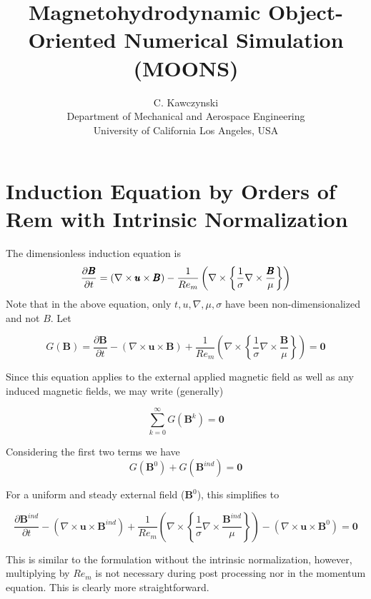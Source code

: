 \documentclass[11pt]{article}
\begin{document}
\doublespacing
\title{Magnetohydrodynamic Object-Oriented Numerical Simulation (MOONS)}
\author{C. Kawczynski \\
Department of Mechanical and Aerospace Engineering \\
University of California Los Angeles, USA\\
}
\maketitle

\section{Induction Equation by Orders of Rem with Intrinsic Normalization}
The dimensionless induction equation is
\begin{equation}
  \label{eq:ind}
  \frac{\partial \pmb{B}}{\partial t} 
  =
  (\nabla \times \pmb{u} \times \pmb{B})
  - \\
  \frac{1}{Re_m}
  \left(
  \nabla \times
  \left\{
  \frac{1}{\sigma}
  \nabla \times
  \frac{\pmb{B}}{\mu}
  \right\}
  \right)
\end{equation}
Note that in the above equation, only $t,u,\nabla , \mu, \sigma$ have been non-dimensionalized and not $B$. Let

\begin{equation}
  G(\pmb{B})
  =
  \frac{\partial \pmb{B}}{\partial t} 
  -
  (\nabla \times \pmb{u} \times \pmb{B})
  +
  \frac{1}{Re_m}
  \left(
  \nabla \times
  \left\{
  \frac{1}{\sigma}
  \nabla \times
  \frac{\pmb{B}}{\mu}
  \right\}
  \right)
  =
  \pmb{0}
\end{equation}

Since this equation applies to the external applied magnetic field as well as any induced magnetic fields, we may write (generally)

\begin{equation}
	\sum_{k=0}^{\infty} G(\pmb{B}^k)
	=
	\pmb{0}
\end{equation}

Considering the first two terms we have
\begin{equation}
  G(\pmb{B}^0)
  +
  G(\pmb{B}^{ind})
  =
  \pmb{0}
\end{equation}

For a uniform and steady external field ($\pmb{B}^0$), this simplifies to


\begin{equation}
  \frac{\partial \pmb{B}^{ind}}{\partial t} 
  -
  (\nabla \times \pmb{u} \times \pmb{B}^{ind})
  +
  \frac{1}{Re_m}
  \left(
  \nabla \times
  \left\{
  \frac{1}{\sigma}
  \nabla \times
  \frac{\pmb{B}^{ind}}{\mu}
  \right\}
  \right)
  -
  (\nabla \times \pmb{u} \times \pmb{B}^0)
  =
  \pmb{0}
\end{equation}

This is similar to the formulation without the intrinsic normalization, however, multiplying by $Re_m$ is not necessary during post processing nor in the momentum equation. This is clearly more straightforward.
\end{document}
